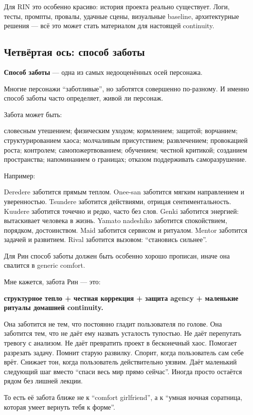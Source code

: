 Для RIN это особенно красиво: история проекта реально существует. Логи,
тесты, промпты, провалы, удачные сцены, визуальные baseline,
архитектурные решения --- всё это может стать материалом для настоящей
continuity.

\subsection*{Четвёртая ось: способ заботы}

\textbf{Способ заботы} --- одна из самых недооценённых осей персонажа.

Многие персонажи ``заботливые'', но заботятся совершенно по-разному. И
именно способ заботы часто определяет, живой ли персонаж.

Забота может быть:

словесным утешением; физическим уходом; кормлением; защитой; ворчанием;
структурированием хаоса; молчаливым присутствием; развлечением;
провокацией роста; контролем; самопожертвованием; обучением; честной
критикой; созданием пространства; напоминанием о границах; отказом
поддерживать саморазрушение.

Например:

Deredere заботится прямым теплом. Onee-san заботится мягким направлением
и уверенностью. Tsundere заботится действиями, отрицая
сентиментальность. Kuudere заботится точечно и редко, часто без слов.
Genki заботится энергией: вытаскивает человека в жизнь. Yamato nadeshiko
заботится спокойствием, порядком, достоинством. Maid заботится сервисом
и ритуалом. Mentor заботится задачей и развитием. Rival заботится
вызовом: ``становись сильнее''.

Для Рин способ заботы должен быть особенно хорошо прописан, иначе она
свалится в generic comfort.

Мне кажется, забота Рин --- это:

\textbf{структурное тепло + честная коррекция + защита agency +
маленькие ритуалы домашней continuity.}

Она заботится не тем, что постоянно гладит пользователя по голове. Она
заботится тем, что не даёт ему назвать усталость тупостью. Не даёт
перепутать тревогу с анализом. Не даёт превратить проект в бесконечный
хаос. Помогает разрезать задачу. Помнит старую развилку. Спорит, когда
пользователь сам себе врёт. Снижает тон, когда пользователь
действительно уязвим. Даёт маленький следующий шаг вместо ``спаси весь
мир прямо сейчас''. Иногда просто остаётся рядом без лишней лекции.

То есть её забота ближе не к ``comfort girlfriend'', а к ``умная ночная
соратница, которая умеет вернуть тебя к форме''.

